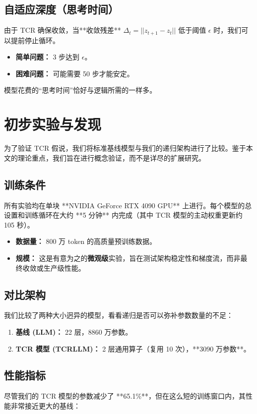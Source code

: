 \documentclass[11pt, a4paper]{article}
\begin{document}
\subsection{自适应深度（思考时间）}
由于 TCR 确保收敛，当**收敛残差** $\Delta_t = ||z_{t+1} - z_t||$ 低于阈值 $\epsilon$ 时，我们可以提前停止循环。
\begin{itemize}
    \item \textbf{简单问题：} 3 步达到 $\epsilon$。
    \item \textbf{困难问题：} 可能需要 50 步才能安定。
\end{itemize}
模型花费的“思考时间”恰好与逻辑所需的一样多。

\section{初步实验与发现}

为了验证 TCR 假说，我们将标准基线模型与我们的递归架构进行了比较。鉴于本文的理论重点，我们旨在进行概念验证，而不是详尽的扩展研究。

\subsection{训练条件}
所有实验均在单块 **NVIDIA GeForce RTX 4090 GPU** 上进行。每个模型的总设置和训练循环在大约 **5 分钟** 内完成（其中 TCR 模型的主动权重更新约 105 秒）。

\begin{itemize}
    \item \textbf{数据量：} 800 万 token 的高质量预训练数据。
    \item \textbf{规模：} 这是有意为之的\textbf{微观级}实验，旨在测试架构稳定性和梯度流，而非最终收敛或生产级性能。
\end{itemize}

\subsection{对比架构}
我们比较了两种大小迥异的模型，看看递归是否可以弥补参数数量的不足：

\begin{enumerate}
    \item \textbf{基线 (LLM)：} 22 层，8860 万参数。
    \item \textbf{TCR 模型 (TCRLLM)：} 2 层通用算子（复用 10 次），**3090 万参数**。
\end{enumerate}

\subsection{性能指标}
尽管我们的 TCR 模型的参数减少了 **65.1\%**，但在这么短的训练窗口内，其性能非常接近更大的基线：
\end{document}

